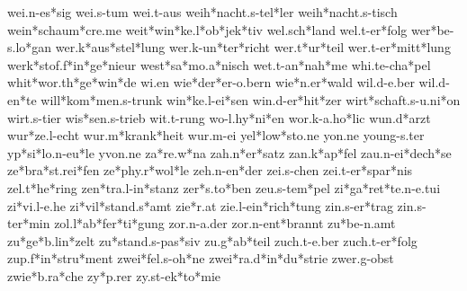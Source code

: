 wei.n-es*sig
wei.s-tum
wei.t-aus
weih*nacht.s-tel*ler
weih*nacht.s-tisch
wein*schaum*cre.me
weit*win*ke.l*ob*jek*tiv
wel.sch*land
wel.t-er*folg
wer*be-s.lo*gan
wer.k*aus*stel*lung
wer.k-un*ter*richt
wer.t*ur*teil
wer.t-er*mitt*lung
werk*stof.f*in*ge*nieur
west*sa*mo.a*nisch
wet.t-an*nah*me
whi.te-cha*pel
whit*wor.th*ge*win*de
wi.en
wie*der*er-o.bern
wie*n.er*wald
wil.d-e.ber
wil.d-en*te
will*kom*men.s-trunk
win*ke.l-ei*sen
win.d-er*hit*zer
wirt*schaft.s-u.ni*on
wirt.s-tier
wis*sen.s-trieb
wit.t-rung
wo-l.hy*ni*en
wor.k-a.ho*lic
wun.d*arzt
wur*ze.l-echt
wur.m*krank*heit
wur.m-ei
yel*low*sto.ne
yon.ne
young-s.ter
yp*si*lo.n-eu*le
yvon.ne
za*re.w*na
zah.n*er*satz
zan.k*ap*fel
zau.n-ei*dech*se
ze*bra*st.rei*fen
ze*phy.r*wol*le
zeh.n-en*der
zei.s-chen
zei.t-er*spar*nis
zel.t*he*ring
zen*tra.l-in*stanz
zer*s.to*ben
zeu.s-tem*pel
zi*ga*ret*te.n-e.tui
zi*vi.l-e.he
zi*vil*stand.s*amt
zie*r.at
zie.l-ein*rich*tung
zin.s-er*trag
zin.s-ter*min
zol.l*ab*fer*ti*gung
zor.n-a.der
zor.n-ent*brannt
zu*be-n.amt
zu*ge*b.lin*zelt
zu*stand.s-pas*siv
zu.g*ab*teil
zuch.t-e.ber
zuch.t-er*folg
zup.f*in*stru*ment
zwei*fel.s-oh*ne
zwei*ra.d*in*du*strie
zwer.g-obst
zwie*b.ra*che
zy*p.rer
zy.st-ek*to*mie
